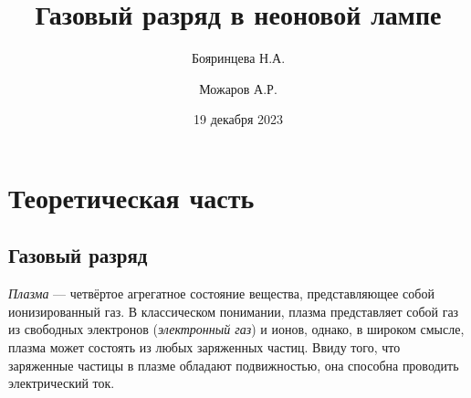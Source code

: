 \documentclass[a4paper, usenames, dvipsnames]{article}
\title{Газовый разряд в неоновой лампе}
\author{Бояринцева Н.А. \and Можаров А.Р.}
\date{19 декабря 2023}
\begin{document}
\maketitle

\section*{\centering Теоретическая часть}

\subsection*{Газовый разряд}

{\it Плазма} --- четвёртое агрегатное состояние вещества,
представляющее собой ионизированный газ.
В классическом понимании, плазма представляет собой газ из
свободных электронов ({\it электронный газ}) и ионов,
однако, в широком смысле, плазма может состоять из любых заряженных частиц.
Ввиду того, что заряженные частицы в плазме обладают подвижностью,
она способна проводить электрический ток.
\end{document}
